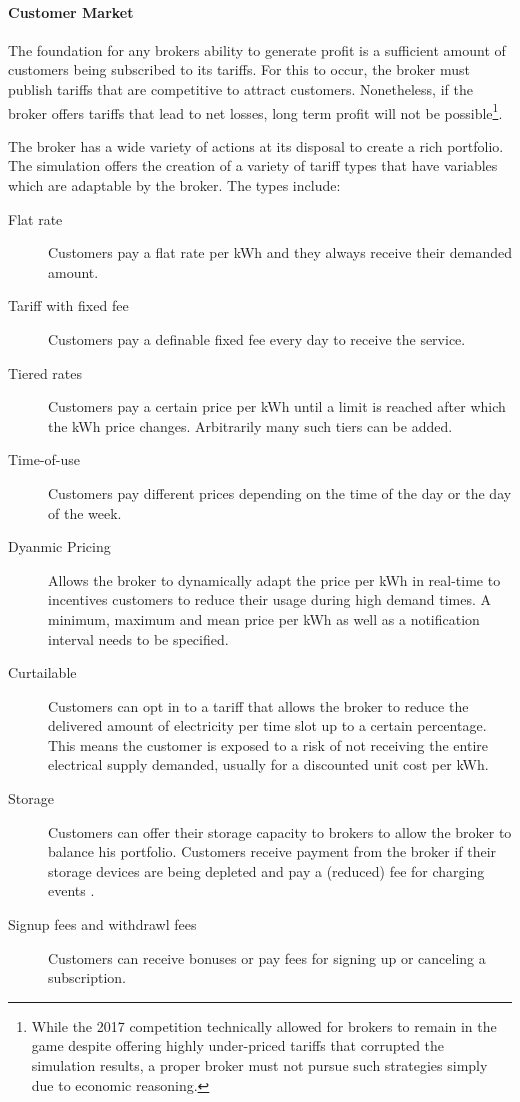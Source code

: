 \paragraph{Customer Market}

The foundation for any brokers ability to generate profit is a sufficient amount of customers being subscribed to its tariffs. For
this to occur, the broker must publish tariffs that are competitive to attract customers. Nonetheless, if the
broker offers tariffs that lead to net losses, long term profit will not be possible\footnote{While the 2017
    competition technically allowed for brokers to remain in the game despite offering highly under-priced tariffs that
    corrupted the simulation results, a proper broker must not pursue such strategies simply due to economic
reasoning.}.

The broker has a wide variety of actions at its disposal to create a rich portfolio. The simulation offers the
creation of a variety of tariff types that have variables which are adaptable by the broker. The types include:

\begin{description}
    \item[Flat rate] Customers pay a flat rate per kWh and they always receive their demanded
        amount.
    \item[Tariff with fixed fee] Customers pay a definable fixed fee every day to receive the service.
    \item [Tiered rates] Customers pay a certain price per kWh until a limit is reached after which the kWh price
        changes.  Arbitrarily many such tiers can be added.  \item[Time-of-use] Customers pay different prices depending
        on the time of the day or the day of the week.  \item[Dyanmic Pricing] Allows the broker to dynamically adapt
        the price per kWh in real-time to incentives customers to reduce their usage during high demand times. A
        minimum, maximum and mean price per kWh as well as a notification interval needs to be specified.
    \item[Curtailable] Customers can opt in to a tariff that allows the broker to reduce the delivered amount of
        electricity per time slot up to a certain percentage. This means the customer is exposed to a risk of not
        receiving the entire electrical supply demanded, usually for a discounted unit cost per kWh.  \item[Storage]
        Customers can offer their storage capacity to brokers to allow the broker to balance his portfolio. Customers
        receive payment from the broker if their storage devices are being depleted and pay a (reduced) fee for charging
        events \citep[p.9]{ketter2018powertac}.
    \item[Signup fees and withdrawl fees] Customers can receive bonuses or pay fees
        for signing up or canceling a subscription.
\end{description}

